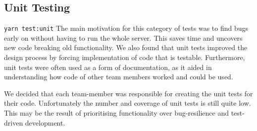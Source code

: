 \subsection{Unit Testing}
\texttt{yarn test:unit} 
The main motivation for this category of tests was to find bugs early on without having to run the whole server. This saves time and uncovers new code breaking old functionality. We also found that unit tests improved the design process by forcing implementation of code that is testable. Furthermore, unit tests were often used as a form of documentation, as it aided in understanding how code of other team members worked and could be used. \par 
We decided that each team-member was responsible for creating the unit tests for their code. Unfortunately the number and coverage of unit tests is still quite low. This may be the result of prioritising functionality over bug-resilience and test-driven development. 
